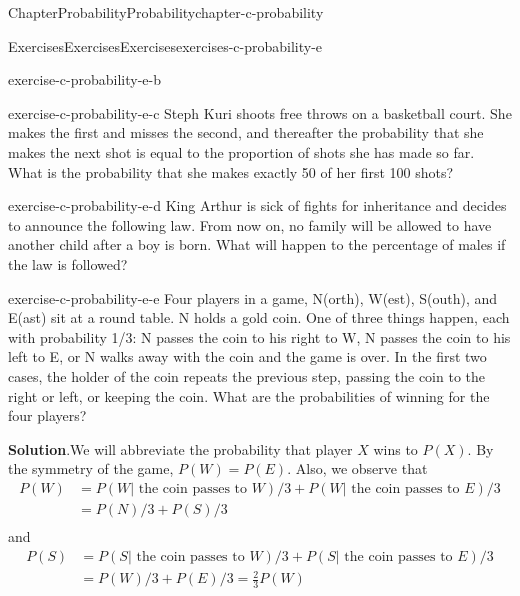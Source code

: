 \documentclass[oneside,10pt,]{book}
\newcommand{\blocktitlefont}{\relax}
\numberwithin{equation}{section}
\begin{document}
\begin{chapterptx}{Chapter}{Probability}{}{Probability}{}{}{chapter-c-probability}
\begin{exercises-section}{Exercises}{Exercises}{}{Exercises}{}{}{exercises-c-probability-e}
\begin{divisionexercise}{1}{}{}{exercise-c-probability-e-b}
\begin{equation*}
\end{equation*}
%
\end{divisionexercise}%
\begin{divisionexercise}{2}{}{}{exercise-c-probability-e-c}%
Steph Kuri shoots free throws on a basketball court. She makes the first and misses the second, and thereafter the probability that she makes the next shot is equal to the proportion of shots she has made so far. What is the probability that she makes exactly 50 of her first 100 shots?%
\end{divisionexercise}%
\begin{divisionexercise}{3}{}{}{exercise-c-probability-e-d}%
King Arthur is sick of fights for inheritance and decides to announce the following law. From now on, no family will be allowed to have another child after a boy is born. What will happen to the percentage of males if the law is followed?%
\end{divisionexercise}%
\begin{divisionexercise}{4}{}{}{exercise-c-probability-e-e}%
Four players in a game, N(orth), W(est), S(outh), and E(ast) sit at a round table. N holds a gold coin. One of three things happen, each with probability 1\slash{}3: N passes the coin to his right to W, N passes the coin to his left to E, or N walks away with the coin and the game is over. In the first two cases, the holder of the coin repeats the previous step, passing the coin to the right or left, or keeping the coin. What are the probabilities of winning for the four players?%
\par\smallskip%
\noindent\textbf{\blocktitlefont Solution}.\hypertarget{solution-c-probability-e-e-b}{}\quad{}We will abbreviate the probability that player \(X\) wins to \(P(X)\).  By the symmetry of the game, \(P(W)=P(E)\).  Also, we observe that%
\begin{equation*}
\begin{split}
P(W)&=P(W | \text{ the coin passes to }W)/3 + P(W |\text{ the coin passes to }E)/3\\
&=P(N)/3 + P(S)/3\\
\end{split}
\end{equation*}
and%
\begin{equation*}
\begin{split}
P(S)&=P(S | \text{ the coin passes to }W)/3 + P(S |\text{ the coin passes to }E)/3\\
&=P(W)/3 + P(E)/3 = \frac{2}{3} P(W)\\
\end{split}

\end{equation*}
\end{divisionexercise}
\end{exercises-section}
\end{chapterptx}
\end{document}
